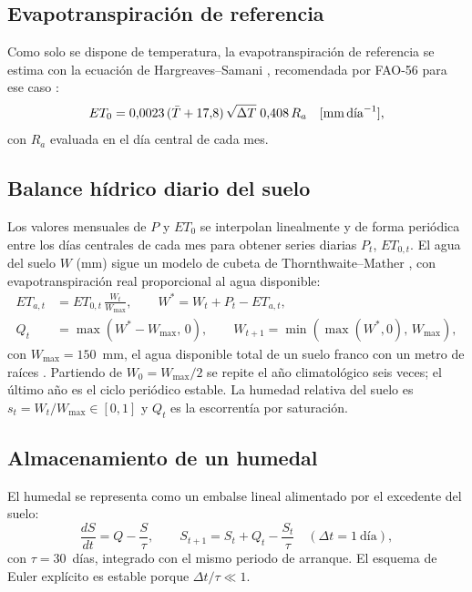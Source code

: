 \documentclass[11pt,a4paper]{article}
\begin{document}
\TablaClimaSitios

\FiguraClimaSitios

\subsection{Evapotranspiración de referencia}
Como solo se dispone de temperatura, la evapotranspiración de referencia se estima con la ecuación de
Hargreaves--Samani \cite{hargreaves1985}, recomendada por FAO-56 para ese caso \cite{allen1998}:
\begin{equation}
  ET_0 = 0{,}0023\,(\bar T + 17{,}8)\,\sqrt{\Delta T}\;0{,}408\,R_a\quad[\text{mm\,día}^{-1}],
\end{equation}
con $R_a$ evaluada en el día central de cada mes.

\subsection{Balance hídrico diario del suelo}
Los valores mensuales de $P$ y $ET_0$ se interpolan linealmente y de forma periódica entre los días
centrales de cada mes para obtener series diarias $P_t$, $ET_{0,t}$. El agua del suelo $W$ (mm) sigue un
modelo de cubeta de Thornthwaite--Mather \cite{thornthwaite1955}, con evapotranspiración real
proporcional al agua disponible:
\begin{equation}
\begin{aligned}
  ET_{a,t} &= ET_{0,t}\,\frac{W_t}{W_{\max}},\qquad W^\ast = W_t + P_t - ET_{a,t},\\
  Q_t &= \max(W^\ast - W_{\max},\,0),\qquad W_{t+1} = \min\!\left(\max(W^\ast,0),\, W_{\max}\right),
\end{aligned}
\end{equation}
con $W_{\max} = 150$~mm, el agua disponible total de un suelo franco con un metro de raíces
\cite{allen1998}. Partiendo de $W_0 = W_{\max}/2$ se repite el año climatológico seis veces; el último año
es el ciclo periódico estable. La humedad relativa del suelo es $s_t = W_t/W_{\max}\in[0,1]$ y $Q_t$ es la
escorrentía por saturación.

\subsection{Almacenamiento de un humedal}
El humedal se representa como un embalse lineal alimentado por el excedente del suelo:
\begin{equation}\label{eq:embalse}
  \frac{dS}{dt} = Q - \frac{S}{\tau},\qquad S_{t+1} = S_t + Q_t - \frac{S_t}{\tau}\quad(\Delta t = 1~\text{día}),
\end{equation}
con $\tau = 30$~días, integrado con el mismo periodo de arranque. El esquema de Euler explícito es estable
porque $\Delta t/\tau \ll 1$.
\end{document}
